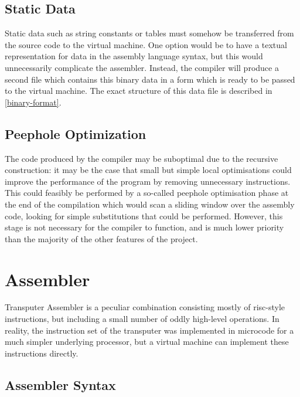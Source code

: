 \subsection{Static Data} \label{static-blob}

Static data such as string constants or tables must somehow be transferred from
the source code to the virtual machine. One option would be to have a textual
representation for data in the assembly language syntax, but this would
unnecessarily complicate the assembler. Instead, the compiler will produce a
second file which contains this binary data in a form which is ready to be
passed to the virtual machine. The exact structure of this data file is
described in \ref{binary-format}.

\subsection{Peephole Optimization}

The code produced by the compiler may be suboptimal due to the recursive
construction: it may be the case that small but simple local optimisations could
improve the performance of the program by removing unnecessary instructions.
This could feasibly be performed by a so-called peephole optimisation phase at
the end of the compilation which would scan a sliding window over the assembly
code, looking for simple substitutions that could be performed. However, this
stage is not necessary for the compiler to function, and is much lower priority
than the majority of the other features of the project.

\section{Assembler}

Transputer Assembler is a peculiar combination consisting mostly of
\gls{risc}-style instructions, but including a small number of oddly high-level
operations. In reality, the instruction set of the transputer was implemented in
microcode for a much simpler underlying processor, but a virtual machine can
implement these instructions directly.

\subsection{Assembler Syntax}


